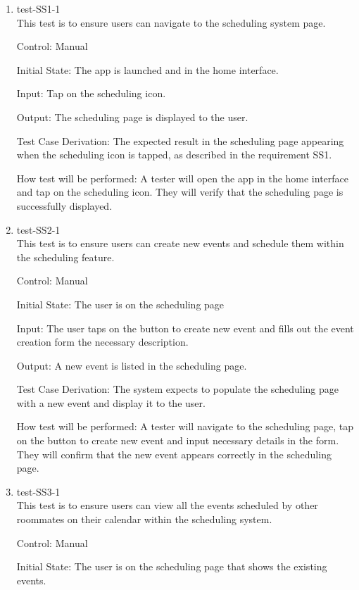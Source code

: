 \documentclass[12pt, titlepage]{article}
\begin{document}
\begin{enumerate}

\item{test-SS1-1\\}
This test is to ensure users can navigate to the scheduling system page.

Control: Manual
					
Initial State: The app is launched and in the home interface.
					
Input: Tap on the scheduling icon.
					
Output: The scheduling page is displayed to the user.

Test Case Derivation: The expected result in the scheduling page appearing when the scheduling icon is tapped, as described in the requirement SS1.
					
How test will be performed: A tester will open the app in the home interface and tap on the scheduling icon. They will verify that the scheduling page is successfully displayed.


\item{test-SS2-1\\}
This test is to ensure users can create new events and schedule them within the scheduling feature.

Control: Manual
					
Initial State: The user is on the scheduling page
					
Input: The user taps on the button to create new event and fills out the event creation form the necessary description.
					
Output: A new event is listed in the scheduling page.

Test Case Derivation: The system expects to populate the scheduling page with a new event and display it to the user. 

How test will be performed: A tester will navigate to the scheduling page, tap on the button to create new event and input necessary details in the form. They will confirm that the new event appears correctly in the scheduling page.

\item{test-SS3-1\\}
This test is to ensure users can view all the events scheduled by other roommates on their calendar within the scheduling system.

Control: Manual
					
Initial State: The user is on the scheduling page that shows the existing events.
					

\end{enumerate}
\end{document}
